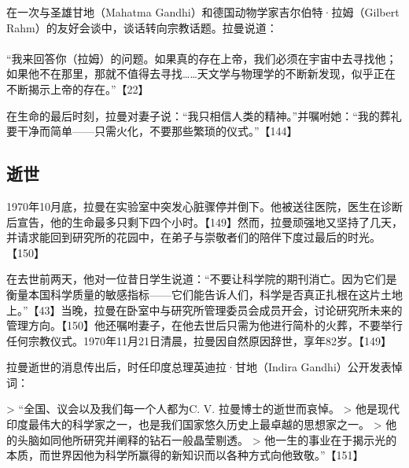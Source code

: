 在一次与圣雄甘地（Mahatma Gandhi）和德国动物学家吉尔伯特·拉姆（Gilbert Rahm）的友好会谈中，谈话转向宗教话题。拉曼说道：\\\\
“我来回答你（拉姆）的问题。如果真的存在上帝，我们必须在宇宙中去寻找他；如果他不在那里，那就不值得去寻找……天文学与物理学的不断新发现，似乎正在不断揭示上帝的存在。”【22】

在生命的最后时刻，拉曼对妻子说：“我只相信人类的精神。”并嘱咐她：“我的葬礼要干净而简单——只需火化，不要那些繁琐的仪式。”【144】
\subsection{逝世}
1970年10月底，拉曼在实验室中突发心脏骤停并倒下。他被送往医院，医生在诊断后宣告，他的生命最多只剩下四个小时。【149】然而，拉曼顽强地又坚持了几天，并请求能回到研究所的花园中，在弟子与崇敬者们的陪伴下度过最后的时光。【150】

在去世前两天，他对一位昔日学生说道：“不要让科学院的期刊消亡。因为它们是衡量本国科学质量的敏感指标——它们能告诉人们，科学是否真正扎根在这片土地上。”【43】当晚，拉曼在卧室中与研究所管理委员会成员开会，讨论研究所未来的管理方向。【150】他还嘱咐妻子，在他去世后只需为他进行简朴的火葬，不要举行任何宗教仪式。1970年11月21日清晨，拉曼因自然原因辞世，享年82岁。【149】

拉曼逝世的消息传出后，时任印度总理英迪拉·甘地（Indira Gandhi）公开发表悼词：

> “全国、议会以及我们每一个人都为C. V. 拉曼博士的逝世而哀悼。
> 他是现代印度最伟大的科学家之一，也是我们国家悠久历史上最卓越的思想家之一。
> 他的头脑如同他所研究并阐释的钻石一般晶莹剔透。
> 他一生的事业在于揭示光的本质，而世界因他为科学所赢得的新知识而以各种方式向他致敬。”【151】
